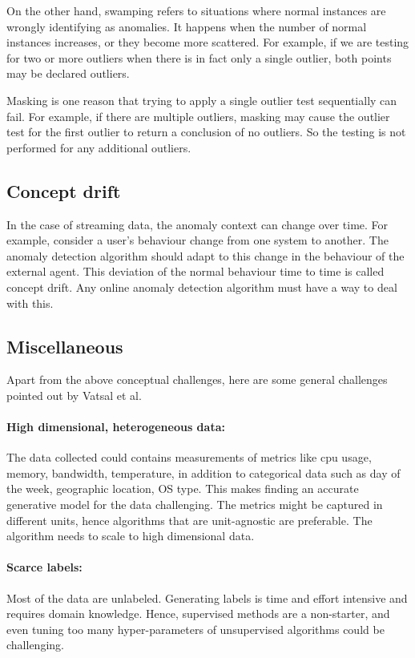 On the other hand, swamping refers to situations where normal instances are wrongly identifying as anomalies.
It happens when the number of normal instances increases, or they become more scattered.
For example, if we are testing for two or more outliers when there is in fact only a single outlier, both points may be declared outliers.

Masking is one reason that trying to apply a single outlier test sequentially can fail.
For example, if there are multiple outliers, masking may cause the outlier test for the first outlier to return a conclusion of no outliers.
So the testing is not performed for any additional outliers.

\subsection{Concept drift}
\label{subsec:concept-drift}

In the case of streaming data, the anomaly context can change over time.
For example, consider a user's behaviour change from one system to another.
The anomaly detection algorithm should adapt to this change in the behaviour of the external agent.
This deviation of the normal behaviour time to time is called concept drift.
Any online anomaly detection algorithm must have a way to deal with this.

\subsection{Miscellaneous}
\label{subsec:misc-challenges}

Apart from the above conceptual challenges, here are some general challenges pointed out by Vatsal et al. \cite{NIPS2019_9710}

\paragraph{High dimensional, heterogeneous data:}
The data collected could contains measurements of metrics like cpu usage, memory, bandwidth, temperature, in addition to categorical data such as day of the week, geographic location, OS type. 
This makes finding an accurate generative model for the data challenging. 
The metrics might be captured in different units, hence algorithms that are unit-agnostic are preferable. 
The algorithm needs to scale to high dimensional data.

\paragraph{Scarce labels:} Most of the data are unlabeled.
Generating labels is time and effort intensive and requires domain knowledge.
Hence, supervised methods are a non-starter, and even tuning too many hyper-parameters of unsupervised algorithms could be challenging.

